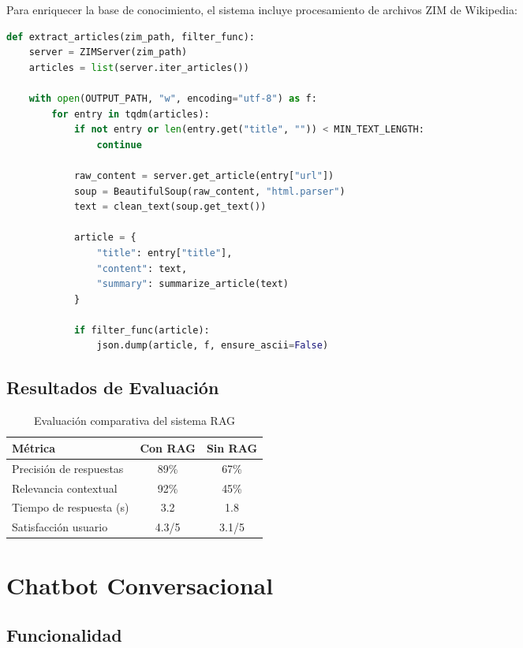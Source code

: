 \documentclass[runningheads]{llncs}
\begin{document}
Para enriquecer la base de conocimiento, el sistema incluye procesamiento de archivos ZIM de Wikipedia:

\begin{lstlisting}[language=Python, caption=Procesamiento de archivos ZIM]
def extract_articles(zim_path, filter_func):
    server = ZIMServer(zim_path)
    articles = list(server.iter_articles())
    
    with open(OUTPUT_PATH, "w", encoding="utf-8") as f:
        for entry in tqdm(articles):
            if not entry or len(entry.get("title", "")) < MIN_TEXT_LENGTH:
                continue
                
            raw_content = server.get_article(entry["url"])
            soup = BeautifulSoup(raw_content, "html.parser")
            text = clean_text(soup.get_text())
            
            article = {
                "title": entry["title"],
                "content": text,
                "summary": summarize_article(text)
            }
            
            if filter_func(article):
                json.dump(article, f, ensure_ascii=False)
\end{lstlisting}

\subsection{Resultados de Evaluación}

\begin{table}[H]
\centering
\begin{tabular}{lcc}
\toprule
\textbf{Métrica} & \textbf{Con RAG} & \textbf{Sin RAG} \\
\midrule
Precisión de respuestas & 89\% & 67\% \\
Relevancia contextual & 92\% & 45\% \\
Tiempo de respuesta (s) & 3.2 & 1.8 \\
Satisfacción usuario & 4.3/5 & 3.1/5 \\
\bottomrule
\end{tabular}
\caption{Evaluación comparativa del sistema RAG}
\end{table}

\section{Chatbot Conversacional}

\subsection{Funcionalidad}
\end{document}
